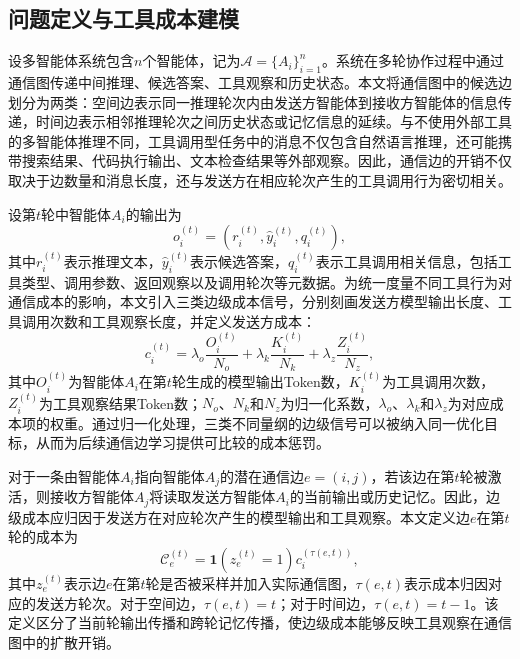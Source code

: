 \subsection{问题定义与工具成本建模}

设多智能体系统包含$n$个智能体，记为$\mathcal{A}=\{A_i\}_{i=1}^{n}$。系统在多轮协作过程中通过通信图传递中间推理、候选答案、工具观察和历史状态。本文将通信图中的候选边划分为两类：空间边表示同一推理轮次内由发送方智能体到接收方智能体的信息传递，时间边表示相邻推理轮次之间历史状态或记忆信息的延续。与不使用外部工具的多智能体推理不同，工具调用型任务中的消息不仅包含自然语言推理，还可能携带搜索结果、代码执行输出、文本检查结果等外部观察。因此，通信边的开销不仅取决于边数量和消息长度，还与发送方在相应轮次产生的工具调用行为密切相关。

设第$t$轮中智能体$A_i$的输出为
\begin{equation}
  o_i^{(t)} = \left(r_i^{(t)}, \hat{y}_i^{(t)}, q_i^{(t)}\right),
  \label{eq:tool-agent-output}
\end{equation}
其中$r_i^{(t)}$表示推理文本，$\hat{y}_i^{(t)}$表示候选答案，$q_i^{(t)}$表示工具调用相关信息，包括工具类型、调用参数、返回观察以及调用轮次等元数据。为统一度量不同工具行为对通信成本的影响，本文引入三类边级成本信号，分别刻画发送方模型输出长度、工具调用次数和工具观察长度，并定义发送方成本：
\begin{equation}
  c_i^{(t)} = \lambda_o \frac{O_i^{(t)}}{N_o}
  + \lambda_k \frac{K_i^{(t)}}{N_k}
  + \lambda_z \frac{Z_i^{(t)}}{N_z},
  \label{eq:tool-cost}
\end{equation}
其中$O_i^{(t)}$为智能体$A_i$在第$t$轮生成的模型输出Token数，$K_i^{(t)}$为工具调用次数，$Z_i^{(t)}$为工具观察结果Token数；$N_o$、$N_k$和$N_z$为归一化系数，$\lambda_o$、$\lambda_k$和$\lambda_z$为对应成本项的权重。通过归一化处理，三类不同量纲的边级信号可以被纳入同一优化目标，从而为后续通信边学习提供可比较的成本惩罚。

对于一条由智能体$A_i$指向智能体$A_j$的潜在通信边$e=(i,j)$，若该边在第$t$轮被激活，则接收方智能体$A_j$将读取发送方智能体$A_i$的当前输出或历史记忆。因此，边级成本应归因于发送方在对应轮次产生的模型输出和工具观察。本文定义边$e$在第$t$轮的成本为
\begin{equation}
  \mathcal{C}_e^{(t)} = \mathbf{1}\!\left(z_e^{(t)}=1\right)c_i^{(\tau(e,t))},
  \label{eq:edge-tool-cost}
\end{equation}
其中$z_e^{(t)}$表示边$e$在第$t$轮是否被采样并加入实际通信图，$\tau(e,t)$表示成本归因对应的发送方轮次。对于空间边，$\tau(e,t)=t$；对于时间边，$\tau(e,t)=t-1$。该定义区分了当前轮输出传播和跨轮记忆传播，使边级成本能够反映工具观察在通信图中的扩散开销。

